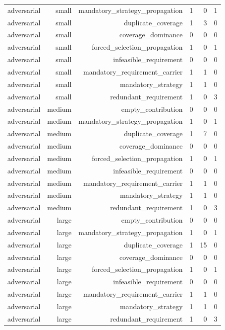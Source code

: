 {\begin{longtable}{lrrrrr}
adversarial & small & mandatory\_strategy\_propagation & 1 & 0 & 1 \\
adversarial & small & duplicate\_coverage & 1 & 3 & 0 \\
adversarial & small & coverage\_dominance & 0 & 0 & 0 \\
adversarial & small & forced\_selection\_propagation & 1 & 0 & 1 \\
adversarial & small & infeasible\_requirement & 0 & 0 & 0 \\
adversarial & small & mandatory\_requirement\_carrier & 1 & 1 & 0 \\
adversarial & small & mandatory\_strategy & 1 & 1 & 0 \\
adversarial & small & redundant\_requirement & 1 & 0 & 3 \\
adversarial & medium & empty\_contribution & 0 & 0 & 0 \\
adversarial & medium & mandatory\_strategy\_propagation & 1 & 0 & 1 \\
adversarial & medium & duplicate\_coverage & 1 & 7 & 0 \\
adversarial & medium & coverage\_dominance & 0 & 0 & 0 \\
adversarial & medium & forced\_selection\_propagation & 1 & 0 & 1 \\
adversarial & medium & infeasible\_requirement & 0 & 0 & 0 \\
adversarial & medium & mandatory\_requirement\_carrier & 1 & 1 & 0 \\
adversarial & medium & mandatory\_strategy & 1 & 1 & 0 \\
adversarial & medium & redundant\_requirement & 1 & 0 & 3 \\
adversarial & large & empty\_contribution & 0 & 0 & 0 \\
adversarial & large & mandatory\_strategy\_propagation & 1 & 0 & 1 \\
adversarial & large & duplicate\_coverage & 1 & 15 & 0 \\
adversarial & large & coverage\_dominance & 0 & 0 & 0 \\
adversarial & large & forced\_selection\_propagation & 1 & 0 & 1 \\
adversarial & large & infeasible\_requirement & 0 & 0 & 0 \\
adversarial & large & mandatory\_requirement\_carrier & 1 & 1 & 0 \\
adversarial & large & mandatory\_strategy & 1 & 1 & 0 \\
adversarial & large & redundant\_requirement & 1 & 0 & 3 \\

\end{longtable}}
